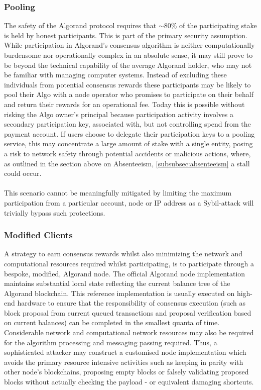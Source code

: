 \documentclass[11pt,a4paper]{article}
\begin{document}
\subsubsection{Pooling}
The safety of the Algorand protocol requires that $\sim$80\% of the participating stake is held by honest participants. 
This is part of the primary security assumption. \\
While participation in Algorand's consensus algorithm is neither computationally burdensome nor operationally complex in 
an absolute sense, it may still prove to be beyond the technical capability of the average Algorand holder, who may not
be familiar with managing computer systems. Instead of excluding these individuals from potential consensus rewards 
these participants may be likely to pool their Algo with a node operator who promises to participate on their behalf and 
return their rewards for an operational fee. Today this is possible without risking the Algo owner’s principal because 
participation activity involves a secondary participation key, associated with, but not controlling spend from the 
payment account. If users choose to delegate their participation keys to a pooling service, this may concentrate a large 
amount of stake with a single entity, posing a risk to network safety through potential accidents or malicious actions, 
where, as outlined in the section above on Absenteeism, \ref{subsubsec:absenteeism} a stall could occur. \\ \\
This scenario cannot be meaningfully mitigated by limiting the maximum participation from a particular account, 
node or IP address as a Sybil-attack will trivially bypass such protections.

\subsubsection{Modified Clients}
A strategy to earn consensus rewards whilst also minimizing the network and computational resources required whilst 
participating, is to participate through a bespoke, modified, Algorand node. The official Algorand node implementation 
maintains substantial local state reflecting the current balance tree of the Algorand blockchain. This reference 
implementation is usually executed on high-end hardware to ensure that the responsibility of consensus execution (such 
as block proposal from current queued transactions and proposal verification based on current balances) can be completed 
in the smallest quanta of time. Considerable network and computational network resources may also be required for the 
algorithm processing and messaging passing required. Thus, a sophisticated attacker may construct a customised node 
implementation which avoids the primary resource intensive activities such as keeping in parity with other node's 
blockchains, proposing empty blocks or falsely validating proposed blocks without actually checking the payload - or 
equivalent damaging shortcuts. 
\end{document}
